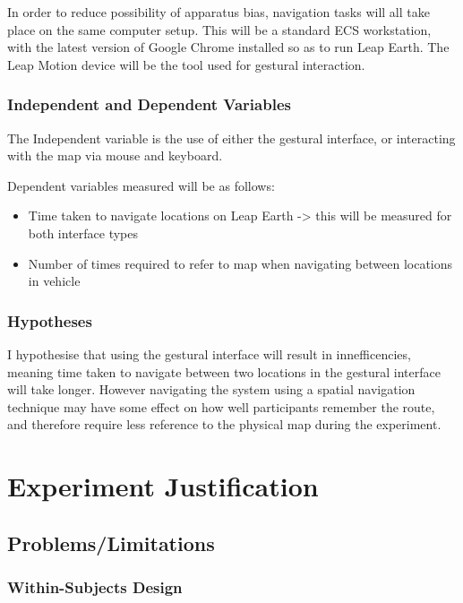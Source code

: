 \documentclass{sigplanconf}
\begin{document}
In order to reduce possibility of apparatus bias, navigation tasks will all take place on the same computer setup. This will be a standard ECS workstation, with the latest version of Google Chrome installed so as to run Leap Earth. The Leap Motion device will be the tool used for gestural interaction.

\subsubsection{Independent and Dependent Variables} 

The Independent variable is the use of either the gestural interface, or interacting with the map via mouse and keyboard. 

Dependent variables measured will be as follows:

\begin{itemize}
\item Time taken to navigate locations on Leap Earth -> this will be measured for both interface types
\item Number of times required to refer to map when navigating between locations in vehicle
\end{itemize}

\subsubsection{Hypotheses}

I hypothesise that using the gestural interface will result in innefficencies, meaning time taken to navigate between two locations in the gestural interface will take longer. However navigating the system using a spatial navigation technique may have some effect on how well participants remember the route, and therefore require less reference to the physical map during the experiment.

\section{Experiment Justification}
\label{sec:discussion}

\subsection{Problems/Limitations}

\subsubsection{Within-Subjects Design}
\end{document}
